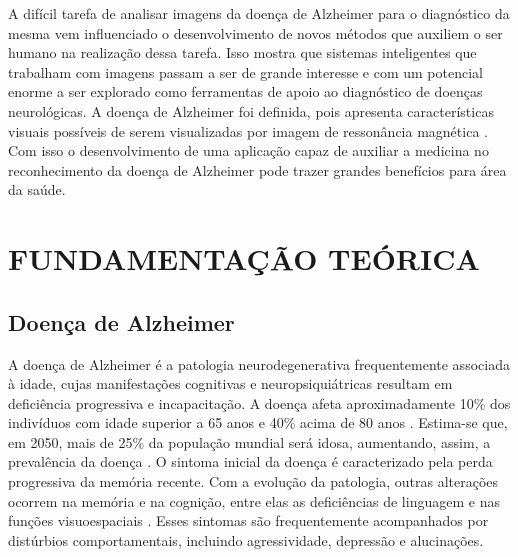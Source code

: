 \documentclass[openright]{UFRGS} %
\begin{document}
A difícil tarefa de analisar imagens da doença de  Alzheimer para o diagnóstico da mesma vem influenciado o desenvolvimento de novos métodos que auxiliem o ser humano na realização dessa tarefa.  Isso mostra que sistemas inteligentes que trabalham com imagens passam a ser de grande interesse e com um potencial enorme a ser explorado como ferramentas de apoio ao diagnóstico de doenças neurológicas.  A doença de  Alzheimer foi definida, pois apresenta características visuais possíveis de serem visualizadas por imagem de ressonância magnética . Com isso o desenvolvimento de uma aplicação  capaz de auxiliar a medicina  no reconhecimento da doença  de Alzheimer  pode trazer grandes benefícios para área da saúde.  

\chapter{FUNDAMENTAÇÃO TEÓRICA} 


\section{Doença de Alzheimer}

A doença de Alzheimer é a patologia neurodegenerativa frequentemente associada à idade, cujas manifestações cognitivas e neuropsiquiátricas resultam em deficiência progressiva e incapacitação. A doença afeta aproximadamente 10\% dos indivíduos com idade superior a 65 anos e 40\% acima de 80 anos \cite{sereniki2008doencca}. Estima-se que, em 2050, mais de 25\% da população mundial será idosa, aumentando, assim, a prevalência da doença \cite{sereniki2008doencca}. O sintoma inicial da doença é caracterizado pela perda progressiva da memória recente. Com a evolução da patologia, outras alterações ocorrem na memória e na cognição, entre elas as deficiências de linguagem e nas funções visuoespaciais \cite{forlenza2005tratamento}. Esses sintomas são frequentemente acompanhados por distúrbios comportamentais, incluindo agressividade, depressão e alucinações. 
\end{document}

